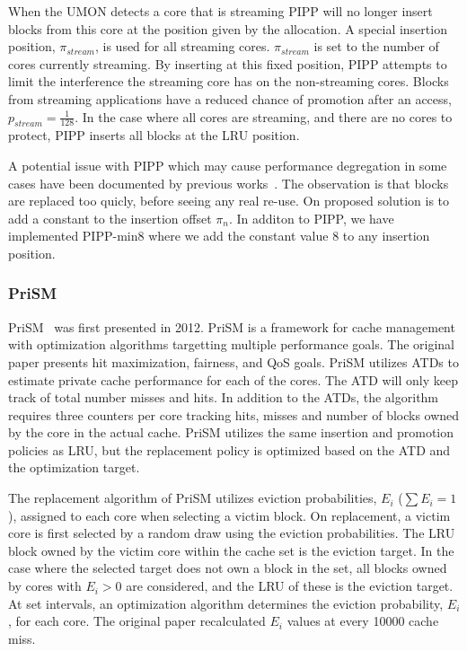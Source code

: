 When the UMON detects a core that is streaming PIPP will no longer insert blocks from this core at the position given by the allocation.
A special insertion position, $\pi_{stream}$, is used for all streaming cores.
$\pi_{stream}$ is set to the number of cores currently streaming. 
By inserting at this fixed position, PIPP attempts to limit the interference the streaming core has on the non-streaming cores.
Blocks from streaming applications have a reduced chance of promotion after an access, $p_{stream} = \frac{1}{128}$.
In the case where all cores are streaming, and there are no cores to protect, PIPP inserts all blocks at the LRU position.

A potential issue with PIPP which may cause performance degregation in some cases have been documented by previous works~\cite{Manikantan2012}.
The observation is that blocks are replaced too quicly, before seeing any real re-use.
On proposed solution is to add a constant to the insertion offset $\pi_n$.
In additon to PIPP, we have implemented PIPP-min8 where we add the constant value 8 to any insertion position.

\subsubsection{PriSM}

PriSM~\cite{Manikantan2012} was first presented in 2012.
PriSM is a framework for cache management with optimization algorithms targetting multiple performance goals.
The original paper presents hit maximization, fairness, and QoS goals.
PriSM utilizes ATDs to estimate private cache performance for each of the cores.
The ATD will only keep track of total number misses and hits.
In addition to the ATDs, the algorithm requires three counters per core tracking hits, misses and number of blocks owned by the core in the actual cache.
PriSM utilizes the same insertion and promotion policies as LRU, but the replacement policy is optimized based on the ATD and the optimization target.

The replacement algorithm of PriSM utilizes eviction probabilities, $E_i$ ($\sum{E_i} = 1$), assigned to each core when selecting a victim block.
On replacement, a victim core is first selected by a random draw using the eviction probabilities.
The LRU block owned by the victim core within the cache set is the eviction target.
In the case where the selected target does not own a block in the set, all blocks owned by cores with $E_i > 0$ are considered, and the LRU of these is the eviction target.
At set intervals, an optimization algorithm determines the eviction probability, $E_i$, for each core.
The original paper recalculated $E_i$ values at every 10000 cache miss.

